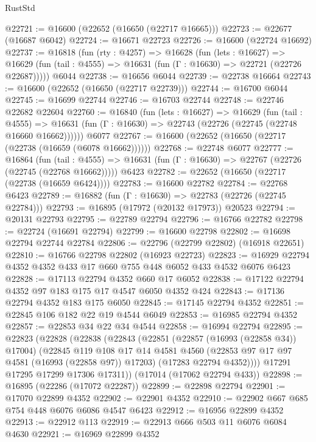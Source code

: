 \begin{lexlean}{RustStd}
\begin{coremodule}
{\begin{coremodule}
{{{{{{{{{{{{{{{{{{{{{{{{{{{{{{{{{{{{{{{{{{{{{{{{{{{{{{{@22721 := @16600 (@22652 (@16650 (@22717 @16665)))
@22723 := @22677 (@16687 @6042)
@22724 := @16671 @22723
@22726 := @16600 (@22724 @16692)
@22737 := @16818
    (fun (rty : @4257) =>
    @16628
      (fun (lets : @16627) =>
      @16629 (fun (tail : @4555) => @16631 (fun (Γ : @16630) => @22721 (@22726 @22687)))))
    @6044
@22738 := @16656 @6044
@22739 := @22738 @16664
@22743 := @16600 (@22652 (@16650 (@22717 @22739)))
@22744 := @16700 @6044
@22745 := @16699 @22744
@22746 := @16703 @22744
@22748 := @22746 @22682 @22604
@22760 := @16840
    (fun (lets : @16627) =>
    @16629
      (fun (tail : @4555) =>
      @16631 (fun (Γ : @16630) => @22743 (@22726 (@22745 (@22748 @16660 @16662))))))
    @6077
@22767 := @16600 (@22652 (@16650 (@22717 (@22738 (@16659 (@6078 @16662))))))
@22768 := @22748 @6077
@22777 := @16864
    (fun (tail : @4555) => @16631 (fun (Γ : @16630) => @22767 (@22726 (@22745 (@22768 @16662)))))
    @6423
@22782 := @22652 (@16650 (@22717 (@22738 (@16659 @6424))))
@22783 := @16600 @22782
@22784 := @22768 @6423
@22789 := @16882 (fun (Γ : @16630) => @22783 (@22726 (@22745 @22784)))
@22793 := @16895 (@17972 (@20132 @17973)) @20523
@22794 := @20131 @22793
@22795 := @22789 @22794
@22796 := @16766 @22782
@22798 := @22724 (@16691 @22794)
@22799 := @16600 @22798
@22802 := @16698 @22794 @22744 @22784
@22806 := @22796 (@22799 @22802) (@16918 @22651)
@22810 := @16766 @22798 @22802 (@16923 @22723)
@22823 := @16929 @22794 @4352 @4352 @433 @17 @660 @755 @448 @6052 @433 @4532 @6076 @6423
@22828 := @17113 @22794 @4352 @660 @17 @6052
@22838 := @17122 @22794 @4352 @97 @183 @175 @17 @4547 @6050 @4352 @424
@22843 := @17136 @22794 @4352 @183 @175 @6050
@22845 := @17145 @22794 @4352
@22851 := @22845 @106 @182 @22 @19 @4544 @6049
@22853 := @16985 @22794 @4352
@22857 := @22853 @34 @22 @34 @4544
@22858 := @16994 @22794
@22895 := @22823
    (@22828
      (@22838
        (@22843
          (@22851
            (@22857 (@16993 (@22858 @34)) @17004)
            (@22845
              @119
              @108
              @17
              @14
              @4581
              @4560
              (@22853 @97 @17 @97 @4581 (@16993 (@22858 @97)) @17203)
              (@17283 @22794 @4352))))
        @17291
        @17295
        @17299
        @17306
        @17311))
    (@17014 (@17062 @22794 @433))
@22898 := @16895 (@22286 (@17072 @22287))
@22899 := @22898 @22794
@22901 := @17070 @22899 @4352
@22902 := @22901 @4352
@22910 := @22902 @667 @685 @754 @448 @6076 @6086 @4547 @6423
@22912 := @16956 @22899 @4352
@22913 := @22912 @113
@22919 := @22913 @666 @503 @11 @6076 @6084 @4630
@22921 := @16969 @22899 @4352
}}}}}}}}}}}}}}}}}}}}}}}}}}}}}}}}}}}}}}}}}}}}}}}}}}}}}}}
\end{coremodule}}
\end{coremodule}
\end{lexlean}
